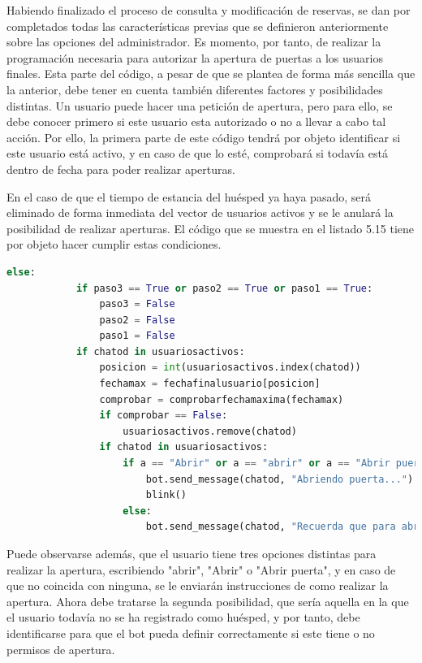 Habiendo finalizado el proceso de consulta y modificación de reservas, se dan por completados todas las características previas que se definieron anteriormente sobre las opciones del administrador. Es momento, por tanto, de realizar la programación necesaria para autorizar la apertura de puertas a los usuarios finales.
Esta parte del código, a pesar de que se plantea de forma más sencilla que la anterior, debe tener en cuenta también diferentes factores y posibilidades distintas. Un usuario puede hacer una petición de apertura, pero para ello, se debe conocer primero si este usuario esta autorizado o no a llevar a cabo tal acción. Por ello, la primera parte de este código tendrá por objeto identificar si este usuario está activo, y en caso de que lo esté, comprobará si todavía está dentro de fecha para poder realizar aperturas.

En el caso de que el tiempo de estancia del huésped ya haya pasado, será eliminado de forma inmediata del vector de usuarios activos y se le anulará la posibilidad de realizar aperturas.
El código que se muestra en el listado 5.15 tiene por objeto hacer cumplir estas condiciones.

\begin{lstlisting}[language=Python,
    caption={Comprobar huéspedes activos},
    label=src:comprobar-huespedes-activos
]
        else:
            if paso3 == True or paso2 == True or paso1 == True:
                paso3 = False
                paso2 = False
                paso1 = False
            if chatod in usuariosactivos:
                posicion = int(usuariosactivos.index(chatod))
                fechamax = fechafinalusuario[posicion]
                comprobar = comprobarfechamaxima(fechamax)
                if comprobar == False:
                    usuariosactivos.remove(chatod)
                if chatod in usuariosactivos:                    
                    if a == "Abrir" or a == "abrir" or a == "Abrir puerta":            
                        bot.send_message(chatod, "Abriendo puerta...")
                        blink()                        
                    else:
                        bot.send_message(chatod, "Recuerda que para abrir solo necesitas escribir la palabra Abrir o pulsar el boton")
\end{lstlisting}

Puede observarse además, que el usuario tiene tres opciones distintas para realizar la apertura, escribiendo "abrir", "Abrir" o "Abrir puerta", y en caso de que no coincida con ninguna, se le enviarán instrucciones de como realizar la apertura.
Ahora debe tratarse la segunda posibilidad, que sería aquella en la que el usuario todavía no se ha registrado como huésped, y por tanto, debe identificarse para que el bot pueda definir correctamente si este tiene o no permisos de apertura.

